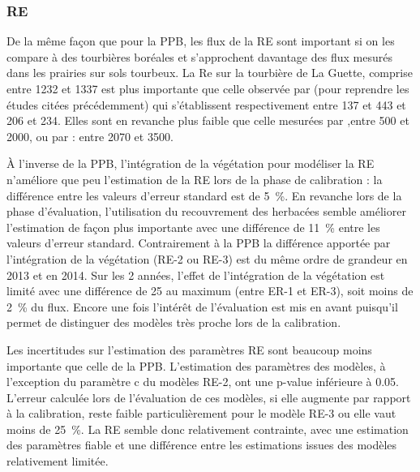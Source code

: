 \subsubsection{RE}

De la même façon que pour la PPB, les flux de la RE sont important si on les compare à des tourbières boréales et s'approchent davantage des flux mesurés dans les prairies sur sols tourbeux.
La Re sur la tourbière de La Guette, comprise entre 1232 et \SI{1337}{\gcma} est plus importante que celle observée par \citep{peichl2014,trudeau2014} (pour reprendre les études citées précédemment) qui s'établissent respectivement entre 137 et \SI{443}{\gcma} et 206 et \SI{234}{\gcma}.
Elles sont en revanche plus faible que celle mesurées par \citep{jacobs2007},entre 500 et \SI{2000}{\gcma}, ou par \citep{gorres2014} : entre 2070 et \SI{3500}{\gcma}. 

%
%
%
%

À l'inverse de la PPB, l'intégration de la végétation pour modéliser la RE n'améliore que peu l'estimation de la RE lors de la phase de calibration : la différence entre les valeurs d'erreur standard est de \SI{5}{\percent}.
En revanche lors de la phase d'évaluation, l'utilisation du recouvrement des herbacées semble améliorer l'estimation de façon plus importante avec une différence de \SI{11}{\percent} entre les valeurs d'erreur standard.
Contrairement à la PPB la différence apportée par l'intégration de la végétation (RE-2 ou RE-3) est du même ordre de grandeur en 2013 et en 2014.
Sur les 2 années, l'effet de l'intégration de la végétation est limité avec une différence de \SI{25}{\gcma} au maximum (entre ER-1 et ER-3), soit moins de \SI{2}{\percent} du flux.
Encore une fois l'intérêt de l'évaluation est mis en avant puisqu'il permet de distinguer des modèles très proche lors de la calibration.


Les incertitudes sur l'estimation des paramètres RE sont beaucoup moins importante que celle de la PPB.
L'estimation des paramètres des modèles, à l'exception du paramètre c du modèles RE-2, ont une p-value inférieure à 0.05.
L'erreur calculée lors de l'évaluation de ces modèles, si elle augmente par rapport à la calibration, reste faible particulièrement pour le modèle RE-3 ou elle vaut moins de \SI{25}{\percent}.
La RE semble donc relativement contrainte, avec une estimation des paramètres fiable et une différence entre les estimations issues des modèles relativement limitée.

